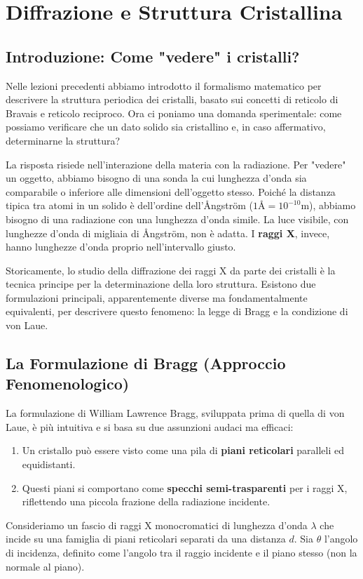 \section{Diffrazione e Struttura Cristallina}
\label{appendix:lesson04}

\subsection{Introduzione: Come "vedere" i cristalli?}
Nelle lezioni precedenti abbiamo introdotto il formalismo matematico per descrivere la struttura periodica dei cristalli, basato sui concetti di reticolo di Bravais e reticolo reciproco. Ora ci poniamo una domanda sperimentale: come possiamo verificare che un dato solido sia cristallino e, in caso affermativo, determinarne la struttura?

La risposta risiede nell'interazione della materia con la radiazione. Per "vedere" un oggetto, abbiamo bisogno di una sonda la cui lunghezza d'onda sia comparabile o inferiore alle dimensioni dell'oggetto stesso. Poiché la distanza tipica tra atomi in un solido è dell'ordine dell'Ångström ($1\text{Å} = 10^{-10} \text{m}$), abbiamo bisogno di una radiazione con una lunghezza d'onda simile. La luce visibile, con lunghezze d'onda di migliaia di Ångström, non è adatta. I \textbf{raggi X}, invece, hanno lunghezze d'onda proprio nell'intervallo giusto.

Storicamente, lo studio della diffrazione dei raggi X da parte dei cristalli è la tecnica principe per la determinazione della loro struttura. Esistono due formulazioni principali, apparentemente diverse ma fondamentalmente equivalenti, per descrivere questo fenomeno: la legge di Bragg e la condizione di von Laue.

\subsection{La Formulazione di Bragg (Approccio Fenomenologico)}
La formulazione di William Lawrence Bragg, sviluppata prima di quella di von Laue, è più intuitiva e si basa su due assunzioni audaci ma efficaci:
\begin{enumerate}
    \item Un cristallo può essere visto come una pila di \textbf{piani reticolari} paralleli ed equidistanti.
    \item Questi piani si comportano come \textbf{specchi semi-trasparenti} per i raggi X, riflettendo una piccola frazione della radiazione incidente.
\end{enumerate}
Consideriamo un fascio di raggi X monocromatici di lunghezza d'onda $\lambda$ che incide su una famiglia di piani reticolari separati da una distanza $d$. Sia $\theta$ l'angolo di incidenza, definito come l'angolo tra il raggio incidente e il piano stesso (non la normale al piano).


